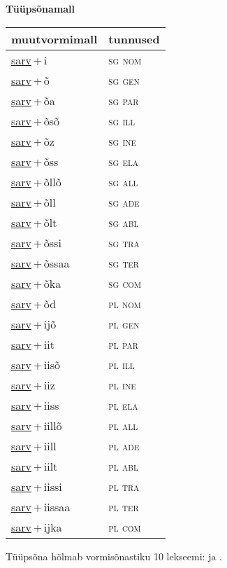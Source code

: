 
\vspace{1.8em}
\begin{minipage}{\textwidth}
\textbf{Tüüpsõnamall \,}\\

\begin{sideways}
\begin{tabular}{l l}
muutvormimall & tunnused \\
\hline
\underline{sarv}\,+\,i & \textsc{ sg nom } \\
\underline{sarv}\,+\,õ & \textsc{ sg gen } \\
\underline{sarv}\,+\,õa & \textsc{ sg par } \\
\underline{sarv}\,+\,õsõ & \textsc{ sg ill } \\
\underline{sarv}\,+\,õz & \textsc{ sg ine } \\
\underline{sarv}\,+\,õss & \textsc{ sg ela } \\
\underline{sarv}\,+\,õllõ & \textsc{ sg all } \\
\underline{sarv}\,+\,õll & \textsc{ sg ade } \\
\underline{sarv}\,+\,õlt & \textsc{ sg abl } \\
\underline{sarv}\,+\,õssi & \textsc{ sg tra } \\
\underline{sarv}\,+\,õssaa & \textsc{ sg ter } \\
\underline{sarv}\,+\,õka & \textsc{ sg com } \\
\underline{sarv}\,+\,õd & \textsc{ pl nom } \\
\underline{sarv}\,+\,ijõ & \textsc{ pl gen } \\
\underline{sarv}\,+\,iit & \textsc{ pl par } \\
\underline{sarv}\,+\,iisõ & \textsc{ pl ill } \\
\underline{sarv}\,+\,iiz & \textsc{ pl ine } \\
\underline{sarv}\,+\,iiss & \textsc{ pl ela } \\
\underline{sarv}\,+\,iillõ & \textsc{ pl all } \\
\underline{sarv}\,+\,iill & \textsc{ pl ade } \\
\underline{sarv}\,+\,iilt & \textsc{ pl abl } \\
\underline{sarv}\,+\,iissi & \textsc{ pl tra } \\
\underline{sarv}\,+\,iissaa & \textsc{ pl ter } \\
\underline{sarv}\,+\,ijka & \textsc{ pl com } \\
\end{tabular}
\end{sideways}
\label{tab:tüüpsõnamall-sarvi}

\end{minipage}

 
\vspace{1em}
\noindent Tüüpsõna hõlmab vormisõnastiku 10 lekseemi:  ja .
